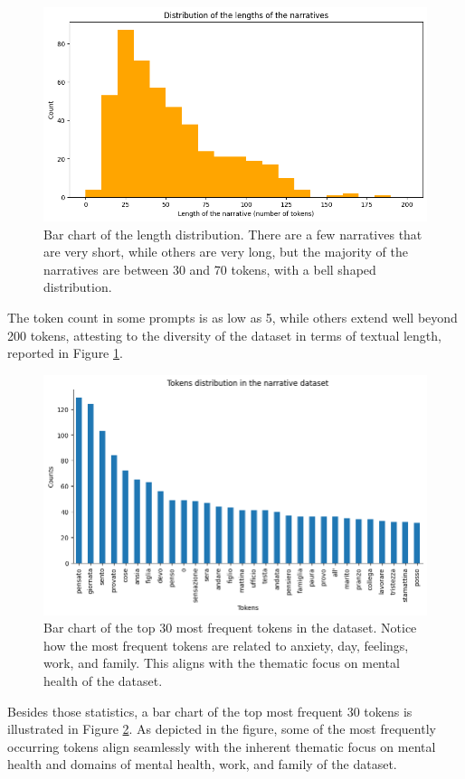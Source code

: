 \begin{figure}[!htbp]
    \centering
    \includegraphics[width=1\linewidth]{assets//imgs/dataset-length-distribution.png}
    \caption{Bar chart of the length distribution. There are a few narratives that are very short, while others are very long, but the majority of the narratives are between 30 and 70 tokens, with a bell shaped distribution.}
    \label{fig:dataset-length-distruibution}
\end{figure}
The token count in some prompts is as low as 5, while others extend well beyond 200 tokens, attesting to the diversity of the dataset in terms of textual length, reported in Figure \ref{fig:dataset-length-distruibution}. %

\begin{figure}[!htbp]
    \centering
    \includegraphics[width=1\linewidth]{assets//imgs/dataset-top-30-prompt.png}
    \caption{Bar chart of the top 30 most frequent tokens in the dataset. Notice how the most frequent tokens are related to anxiety, day, feelings, work, and family. This aligns with the thematic focus on mental health of the dataset.}
    \label{fig:dataset-top-30-prompt}
\end{figure}

Besides those statistics, a bar chart of the top most frequent 30 tokens is illustrated in Figure \ref{fig:dataset-top-30-prompt}. As depicted in the figure, some of the most frequently occurring tokens align seamlessly with the inherent thematic focus on mental health and domains of mental health, work, and family of the dataset.

